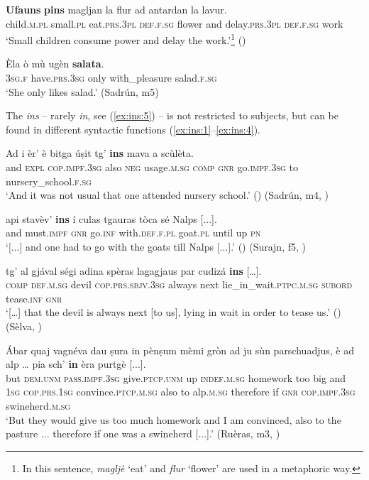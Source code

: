 \ea
\label{ex:gen:5}
\gll  \textbf{Ufauns} \textbf{pins} magljan la flur ad antardan la lavur.\\
child.\textsc{m.pl} small.\textsc{pl} eat.\textsc{prs.3pl} \textsc{def.f.sg} flower and delay.\textsc{prs.3pl} \textsc{def.f.sg} work\\
\glt `Small children consume power and delay the work.'\footnote{In this sentence, \textit{magljè} `eat' and \textit{flur} `flower' are used in a metaphoric way.} ()
\z

\ea\label{ex:gen:6}
\gll Èla ò mù ugèn \textbf{salata}.\\
\textsc{3sg.f} have.\textsc{prs.3sg} only with\_pleasure salad.\textsc{f.sg}\\
\glt `She only likes salad.' (Sadrún, m5)
\z

The  \textit{ins} -- rarely \textit{in}, see (\ref{ex:ins:5}) -- is not restricted to subjects, but can be found in different syntactic functions (\ref{ex:ins:1}--\ref{ex:ins:4}).

\ea\label{ex:ins:1}
\gll Ad i èr’ è bitga úṣit tg’ \textbf{ins} mava a scùlèta.\\
and  \textsc{expl} \textsc{cop.impf.3sg} also \textsc{neg} usage.\textsc{m.sg}  \textsc{comp} \textsc{gnr} go.\textsc{impf.3sg} to nursery\_school.\textsc{f.sg}\\
\glt `And it was not usual that one attended nursery school.' () (Sadrún, m4, )
\z

\ea
\label{ex:ins:2}
\gll   [...] api stavèv’ \textbf{ins} í culas tgauras tòca sé Nalps [...]. \\
{} and  must.\textsc{impf} \textsc{gnr} go.\textsc{inf} with.\textsc{def.f.pl} goat.\textsc{pl} until up  \textsc{pn}\\
\glt `[...] and one had to go with the goats till Nalps [...].' () (Surajn, f5, )
\z

\ea
\label{ex:ins:3}
\gll  […] tg’ al gjával ségi adina spèras lagagjaus par cudizá \textbf{ins} […].\\
{}  \textsc{comp} \textsc{def.m.sg} devil \textsc{cop.prs.sbjv.3sg} always next lie\_in\_wait.\textsc{ptpc.m.sg} \textsc{subord} tease.\textsc{inf} \textsc{gnr}\\
\glt `[…] that the devil is always next [to us], lying in wait in order to tease us.' () (Sèlva, \citealt[46]{Büchli1966})
\z

\ea
\label{ex:ins:4}
	\gll  Ábar quaj vagnéva dau ṣura in pènṣum mèmi gròn ad ju sùn parschuadjus, è ad alp … pia sch’ \textbf{in} èra purtgè [...].  \\
but \textsc{dem.unm} \textsc{pass.impf.3sg} give.\textsc{ptcp.unm} up \textsc{indef.m.sg} homework too big and \textsc{1sg} \textsc{cop.prs.1sg} convince.\textsc{ptcp.m.sg} also to alp.\textsc{m.sg} {} therefore if \textsc{gnr} \textsc{cop.impf.3sg} swineherd.\textsc{m.sg}\\
\glt `But they would give us too much homework and I am convinced, also to the pasture ... therefore if one was a swineherd [...].' (Ruèras, m3, )
\z

